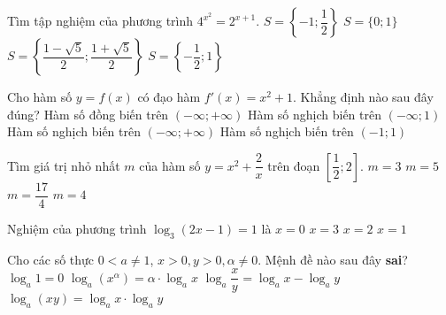 \begin{ex}%
	Tìm tập nghiệm của phương trình $4^{x^2}=2^{x+1}$.
	\choice
	 {$S=\left\{-1 ;\dfrac 12\right\}$}
	 {$S=\{0 ; 1\}$}
	 {$S=\left\{\dfrac{1-\sqrt 5}2;\dfrac{1+\sqrt 5}2\right\}$}
	 {\True $S=\left\{-\dfrac 12; 1\right\}$}
\end{ex}


\begin{ex}%
	Cho hàm số $y=f(x)$ có đạo hàm $f'(x)=x^2+1$. Khẳng định nào sau đây đúng?
	\choice
	 {\True Hàm số đồng biến trên $(-\infty ;+\infty)$}
	 {Hàm số nghịch biến trên $(-\infty ; 1)$}
	 {Hàm số nghịch biến trên $(-\infty ;+\infty)$}
	 {Hàm số nghịch biến trên $(-1 ; 1)$}
\end{ex}


\begin{ex}%
	Tìm giá trị nhỏ nhất $m$ của hàm số $y=x^2+\dfrac 2 x$ trên đoạn $\left[\dfrac 12; 2\right]$.
	\choice
	 {\True $m=3$}
	 {$m=5$}
	 {$m=\dfrac{17}4$}
	 {$m=4$}
\end{ex}


\begin{ex}%
	Nghiệm của phương trình $\log_3(2x-1)=1$ là
	\choice
	 {$x=0$}
	 {$x=3$}
	 {\True $x=2$}
	 {$x=1$}
\end{ex}


\begin{ex}%
	Cho các số thực $0<a \neq 1$, $x>0, y>0, \alpha \neq 0$. Mệnh đề nào sau đây \textbf{sai}?
	\choice
	{$\log_a1=0$}
	{$\log_a\left(x^{\alpha}\right)=\alpha\cdot\log_ax $}
	{$\log_a\dfrac xy=\log_ax-\log_ay $}
	{\True $\log_a(x y)=\log_ax\cdot\log_ay$}
\end{ex}


